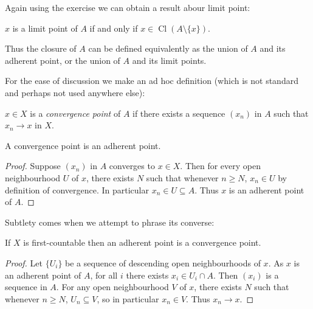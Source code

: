 \documentclass[a4paper]{article}
\DeclareMathOperator{\Cl}{Cl}
\begin{document}
Again using the exercise we can obtain a result abour limit point:

\begin{corollary}
  \(x\) is a limit point of \(A\) if and only if \(x \in \Cl (A \setminus \{x\})\).
\end{corollary}

Thus the closure of \(A\) can be defined equivalently as the union of \(A\) and its adherent point, or the union of \(A\) and its limit points.

For the ease of discussion we make an ad hoc definition (which is not standard and perhaps not used anywhere else):

\begin{definition}
  \(x \in X\) is a \emph{convergence point} of \(A\) if there exists a sequence \((x_n)\) in \(A\) such that \(x_n \to x\) in \(X\).
\end{definition}


\begin{proposition}
  A convergence point is an adherent point.
\end{proposition}

\begin{proof}
  Suppose \((x_n)\) in \(A\) converges to \(x \in X\). Then for every open neighbourhood \(U\) of \(x\), there exists \(N\) such that whenever \(n \geq N\), \(x_n \in U\) by definition of convergence. In particular \(x_n \in U \subseteq A\). Thus \(x\) is an adherent point of \(A\).
\end{proof}

Subtlety comes when we attempt to phrase its converse:

\begin{proposition}
  If \(X\) is first-countable then an adherent point is a convergence point.
\end{proposition}

\begin{proof}
  Let \(\{U_i\}\) be a sequence of descending open neighbourhoods of \(x\). As \(x\) is an adherent point of \(A\), for all \(i\) there exists \(x_i \in U_i \cap A\). Then \((x_i)\) is a sequence in \(A\). For any open neighbourhood \(V\) of \(x\), there exists \(N\) such that whenever \(n \geq N\), \(U_n \subseteq V\), so in particular \(x_n \in V\). Thus \(x_n \to x\).
\end{proof}
\end{document}
